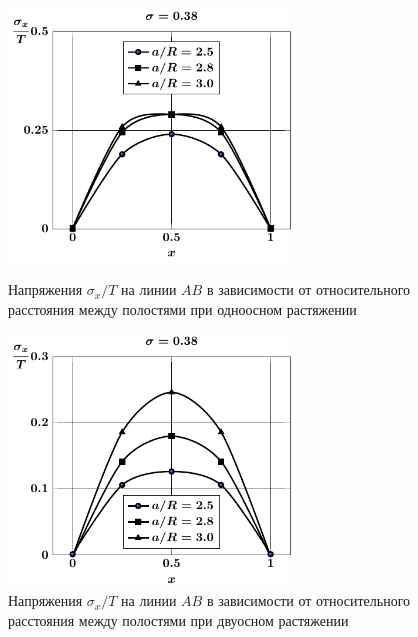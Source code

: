 \begin{figure}[h!]
\centering\footnotesize
\parbox[b]{7.5cm}{\centering\includegraphics[width=7.5cm]{spheres-cav13-a-t1-sig_x.pdf}
\caption{Напряжения $\sigma_x/T$ на линии $AB$ в зависимости от относительного расстояния между полостями при одноосном растяжении
\label{f:8:38}}}\hfil\hfil
\parbox[b]{7.5cm}{\centering\includegraphics[width=7.5cm]{spheres-cav13-a-t2-sig_x.pdf}
\caption{Напряжения $\sigma_x/T$ на линии $AB$ в зависимости от относительного расстояния между полостями при двуосном растяжении
\label{f:8:39}}}
\end{figure}

